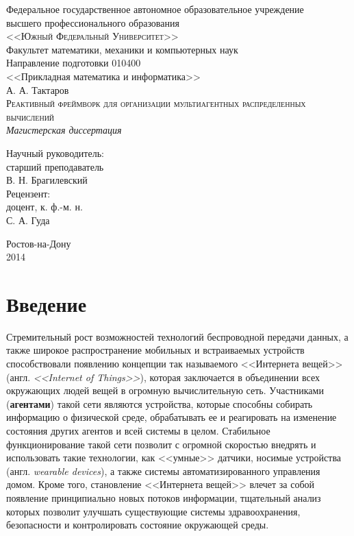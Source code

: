 \documentclass[a4paper,14pt,href]{article}
\begin{document}
\thispagestyle{empty}
\begin{center}
Федеральное государственное автономное образовательное учреждение \\
высшего профессионального образования \\
\textsc{<<Южный Федеральный Университет>>}\\[1.0cm]

Факультет математики, механики и компьютерных наук\\[1.0cm]

Направление подготовки 010400 \\
<<Прикладная математика и информатика>>\\[3cm]

А. А. Тактаров \\[1.0cm]
\textsc{Реактивный фреймворк для организации мультиагентных распределенных вычислений}\\[1.0cm]

\textit{Магистерская диссертация}\\[2.0cm]

\begin{flushright}
    Научный руководитель: \\
    старший преподаватель \\
    В. Н. Брагилевский \\[1.0cm]

    Рецензент: \\
    доцент, к. ф.-м. н.\\
    С. А. Гуда
\end{flushright}

\vfill

  Ростов-на-Дону\\
  2014
\end{center}

\newpage
\tableofcontents

\newpage
\section*{Введение}

Стремительный рост возможностей технологий беспроводной передачи данных, а также широкое распространение мобильных и
встраиваемых устройств способствовали появлению концепции так называемого <<Интернета вещей>>
(англ. \textit{<<Internet of Things>>})\cite{IoTWired}, которая заключается в объединении всех окружающих людей вещей в
огромную вычислительную сеть. Участниками (\textbf{агентами}) такой сети являются устройства, которые способны собирать
информацию о физической среде, обрабатывать ее и реагировать на изменение состояния других агентов и всей системы в целом.
Стабильное функционирование такой сети позволит с огромной скоростью внедрять и использовать такие технологии, как
<<умные>> датчики\cite{NestThermostat}, носимые устройства (англ. \textit{wearable devices}), а также системы
автоматизированного управления домом. Кроме того, становление <<Интернета вещей>> влечет за собой появление
принципиально новых потоков информации, тщательный анализ которых позволит улучшать существующие системы
здравоохранения, безопасности и контролировать состояние окружающей среды.
\end{document}
